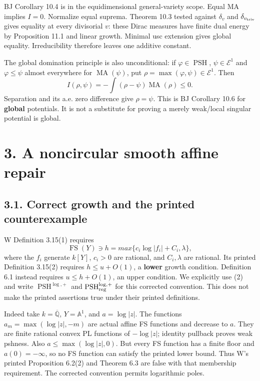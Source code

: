 \documentclass[
  11pt,
]{article}
\begin{document}
BJ Corollary 10.4 is in the equidimensional general-variety scope. Equal
MA implies \(I=0\). Normalize equal suprema. Theorem 10.3 tested against
\(\delta_v\) and \(\delta_{v_{\rm triv}}\) gives equality at every
divisorial \(v\): these Dirac measures have finite dual energy by
Proposition 11.1 and linear growth. Minimal usc extension gives global
equality. Irreducibility therefore leaves one additive constant.

The global domination principle is also unconditional: if
\(\varphi\in\operatorname{PSH}\), \(\psi\in\mathcal E^1\) and
\(\varphi\leq\psi\) almost everywhere for \(\operatorname{MA}(\psi)\),
put \(\rho=\max(\varphi,\psi)\in\mathcal E^1\). Then
\[I(\rho,\psi)=-\int(\rho-\psi)\operatorname{MA}(\rho)\leq0.\]
Separation and its a.e. zero difference give \(\rho=\psi\). This is BJ
Corollary 10.6 for \textbf{global} potentials. It is not a substitute
for proving a merely weak/local singular potential is global.

\section{3. A noncircular smooth affine
repair}\label{a-noncircular-smooth-affine-repair}

\subsection{3.1. Correct growth and the printed
counterexample}\label{correct-growth-and-the-printed-counterexample}

W Definition 3.15(1) requires \[
 \operatorname{FS}(Y)\ni h=max\{c_i\log|f_i|+C_i,\lambda\},
\] where the \(f_i\) generate \(k[Y]\), \(c_i>0\) are rational, and
\(C_i,\lambda\) are rational. Its printed Definition 3.15(2) requires
\(h\leq u+O(1)\), a \textbf{lower} growth condition. Definition 6.1
instead requires \(u\leq h+O(1)\), an upper condition. We explicitly use
(2) and write \(\operatorname{PSH}^{\log,+}\) and
\(\operatorname{PSH}^{\log,+}_{\rm reg}\) for this corrected convention.
This does not make the printed assertions true under their printed
definitions.

Indeed take \(k=\overline{\mathbb Q}\), \(Y=\mathbb A^1\), and
\(a=\log|z|\). The functions \(a_m=\max(\log|z|,-m)\) are actual affine
FS functions and decrease to \(a\). They are finite rational convex PL
functions of \(-\log|z|\); identity pullback proves weak pshness. Also
\(a\leq\max(\log|z|,0)\). But every FS function has a finite floor and
\(a(0)=-\infty\), so no FS function can satisfy the printed lower bound.
Thus W's printed Proposition 6.2(2) and Theorem 6.3 are false with that
membership requirement. The corrected convention permits logarithmic
poles.
\end{document}
